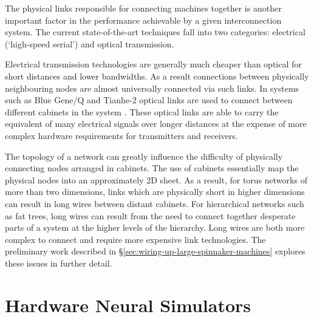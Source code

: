 			The physical links responsible for connecting machines together is another
			important factor in the performance achievable by a given interconnection
			system. The current state-of-the-art techniques fall into two categories:
			electrical (`high-speed serial') and optical transmission.
			
			Electrical transmission technologies are generally much cheaper than
			optical for short distances and lower bandwidths. As a result connections
			between physically neighbouring nodes are almost universally connected via
			such links. In systems such as Blue Gene/Q and Tianhe-2 optical links are
			used to connect between different cabinets in the system
			\cite{dongarra13,prickett10}. These optical links are able to carry the
			equivalent of many electrical signals over longer distances at the expense
			of more complex hardware requirements for transmitters and receivers.
			
			The topology of a network can greatly influence the difficulty of
			physically connecting nodes arranged in cabinets. The use of cabinets
			essentially map the physical nodes into an approximately 2D sheet. As a
			result, for torus networks of more than two dimensions, links which are
			physically short in higher dimensions can result in long wires between
			distant cabinets. For hierarchical networks such as fat trees, long wires
			can result from the need to connect together desperate parts of a system
			at the higher levels of the hierarchy. Long wires are both more complex to
			connect and require more expensive link technologies. The preliminary work
			described in \S\ref{sec:wiring-up-large-spinnaker-machines} explores these
			issues in further detail.
			
			
	
	\section{Hardware Neural Simulators}
		
		
